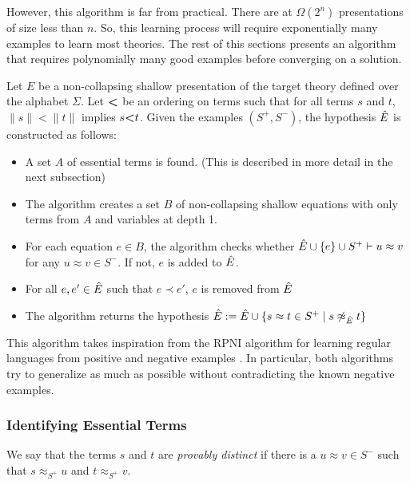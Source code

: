 However, this algorithm is far from practical. 
There are at $\Omega(2^n)$ presentations of size less than $n$. 
So, this learning process will require exponentially many examples to learn most theories. 
The rest of this sections presents an algorithm that requires polynomially many good examples before converging on a solution. 





Let $E$ be a non-collapsing shallow presentation of the target theory defined over the alphabet $\Sigma$.
Let $\textbf{\textless}$ be an ordering on terms such that for all terms $s$ and $t$, $\|s\| < \|t\|$ implies $s \textbf{\textless} t$. 
Given the examples $(S^+, S^-)$, the hypothesis $\ahat{E}$ is constructed as follows: 
\begin{itemize}
\item A set $A$ of essential terms is found. (This is described in more detail in the next subsection)
\item The algorithm creates a set $B$ of non-collapsing shallow equations with only terms from $A$ and variables at depth 1. 
\item For each equation $e \in B$, the algorithm checks whether $\ahat{E} \cup \{e\} \cup S^+ \vdash u \approx v$ for any $u \approx v \in S^-$. If not, $e$ is added to $\ahat{E}$.
\item For all $e,e' \in \ahat{E}$ such that $e \prec e'$, $e$ is removed from $\ahat{E}$
\item The algorithm returns the hypothesis $\ahat{E} := \ahat{E} \cup \{ s\approx t \in S^+\; | \; s \not\approx_{\ahat{E}} t \}$ 
\end{itemize}

This algorithm takes inspiration from the RPNI algorithm for learning regular languages from positive and negative examples \citep{oncina1992inferring}.
In particular, both algorithms try to generalize as much as possible without contradicting the known negative examples. 



\subsubsection{Identifying Essential Terms}

We say that the terms $s$ and $t$ are \emph{provably distinct } if there is a  $u \approx v \in S^-$ such that $s \approx_{S^+} u$ and $t \approx_{S^+} v$. %


